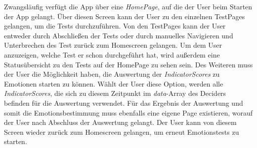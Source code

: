 Zwangsläufig verfügt die App über eine \textit{HomePage}, auf die der User beim Starten der App gelangt. Über diesen Screen kann der User zu den einzelnen TestPages gelangen, um die Tests durchzuführen. Von den TestPages kann der User entweder durch Abschließen der Tests oder durch manuelles Navigieren und Unterbrechen des Test zurück zum Homescreen gelangen. Um dem User anzuzeigen, welche Test er schon durchgeführt hat, wird außerdem eine Statusübersicht zu den Tests auf der HomePage zu sehen sein. Des Weiteren muss der User die Möglichkeit haben, die Auswertung der \textit{IndicatorScores} zu Emotionen starten zu können. Wählt der User diese Option, werden alle \textit{IndicatorScores}, die sich zu diesem Zeitpunkt im \textit{data}-Array des Deciders befinden für die Auswertung verwendet. \newline
Für das Ergebnis der Auswertung und somit die Emotionsbestimmung muss ebenfalls eine eigene Page existieren, worauf der User nach Abschluss der Auswertung gelangt. Der User kann von diesem Screen wieder zurück zum Homescreen gelangen, um erneut Emotionstests zu starten. 
